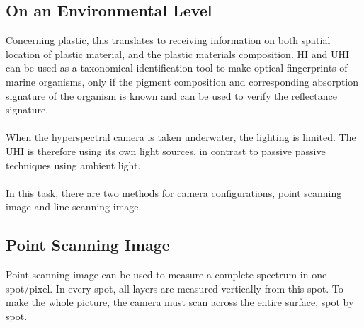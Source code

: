 \subsection{On an Environmental Level}
\noindent
Concerning plastic, this translates to receiving information on both spatial location of plastic material, and the plastic materials composition. 
%
%
\noindent
HI and UHI can be used as a taxonomical identification tool to make optical fingerprints of marine organisms, only if the pigment composition and corresponding absorption signature of the organism is known and can be used to verify the reflectance signature.
\\\\
\noindent
When the hyperspectral camera is taken underwater, the lighting is limited. The UHI is therefore using its own light sources, in contrast to passive passive techniques using ambient light.
\\\\
\noindent
In this task, there are two methods for camera configurations, point scanning image and line scanning image.
\subsection{Point Scanning Image}
Point scanning image can be used to measure a complete spectrum in one spot/pixel. In every spot, all layers are measured vertically from this spot. To make the whole picture, the camera must scan across the entire surface, spot by spot.




